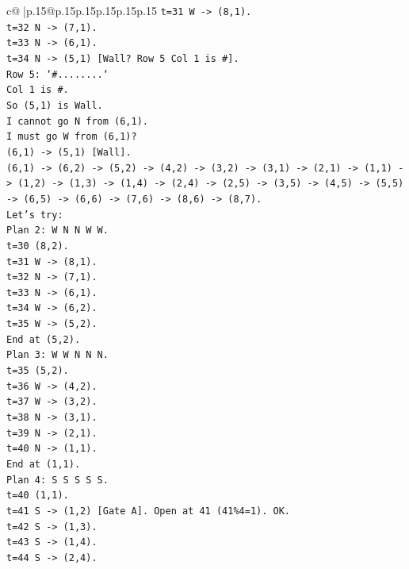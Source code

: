 \documentclass{article}
\begin{document}
{\begin{supertabular}{c@{$\;$}|p{.15\linewidth}@{}p{.15\linewidth}p{.15\linewidth}p{.15\linewidth}p{.15\linewidth}p{.15\linewidth}}
{{{\texttt{t=31 W {-}> (8,1).} \\
\texttt{t=32 N {-}> (7,1).} \\
\texttt{t=33 N {-}> (6,1).} \\
\texttt{t=34 N {-}> (5,1) {[}Wall? Row 5 Col 1 is \#{]}.} \\
\texttt{Row 5: `\#........`} \\
\texttt{Col 1 is \#.} \\
\texttt{So (5,1) is Wall.} \\
\texttt{I cannot go N from (6,1).} \\
\texttt{I must go W from (6,1)?} \\
\texttt{(6,1) {-}> (5,1) {[}Wall{]}.} \\
\texttt{(6,1) {-}> (6,2) {-}> (5,2) {-}> (4,2) {-}> (3,2) {-}> (3,1) {-}> (2,1) {-}> (1,1) {-}> (1,2) {-}> (1,3) {-}> (1,4) {-}> (2,4) {-}> (2,5) {-}> (3,5) {-}> (4,5) {-}> (5,5) {-}> (6,5) {-}> (6,6) {-}> (7,6) {-}> (8,6) {-}> (8,7).} \\
\texttt{Let's try:} \\
\texttt{Plan 2: W N N W W.} \\
\texttt{t=30 (8,2).} \\
\texttt{t=31 W {-}> (8,1).} \\
\texttt{t=32 N {-}> (7,1).} \\
\texttt{t=33 N {-}> (6,1).} \\
\texttt{t=34 W {-}> (6,2).} \\
\texttt{t=35 W {-}> (5,2).} \\
\texttt{End at (5,2).} \\
\texttt{Plan 3: W W N N N.} \\
\texttt{t=35 (5,2).} \\
\texttt{t=36 W {-}> (4,2).} \\
\texttt{t=37 W {-}> (3,2).} \\
\texttt{t=38 N {-}> (3,1).} \\
\texttt{t=39 N {-}> (2,1).} \\
\texttt{t=40 N {-}> (1,1).} \\
\texttt{End at (1,1).} \\
\texttt{Plan 4: S S S S S.} \\
\texttt{t=40 (1,1).} \\
\texttt{t=41 S {-}> (1,2) {[}Gate A{]}. Open at 41 (41\%4=1). OK.} \\
\texttt{t=42 S {-}> (1,3).} \\
\texttt{t=43 S {-}> (1,4).} \\
\texttt{t=44 S {-}> (2,4).} \\
}}}
\end{supertabular}}
\end{document}
